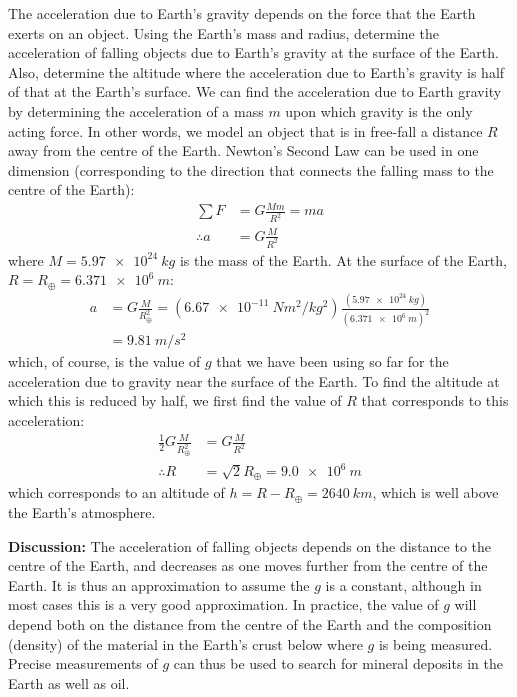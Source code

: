 \begin{example}{\label{ex:gravity:gofr}The acceleration due to Earth's gravity depends on the force that the Earth exerts on an object. Using the Earth's mass and radius, determine the acceleration of falling objects due to Earth's gravity at the surface of the Earth. Also, determine the altitude where the acceleration due to Earth's gravity is half of that at the Earth's surface.}
We can find the acceleration due to Earth gravity by determining the acceleration of a mass $m$ upon which gravity is the only acting force. In other words, we model an object that is in free-fall a distance $R$ away from the centre of the Earth. Newton's Second Law can be used in one dimension (corresponding to the direction that connects the falling mass to the centre of the Earth):
\begin{align*}
\sum F &= G\frac{Mm}{R^2}=ma\\
\therefore a&=G\frac{M}{R^2}
\end{align*}
where $M=\SI{5.97e24}{kg}$ is the mass of the Earth. At the surface of the Earth, $R=R_\oplus=\SI{6.371e6}{m}$:
\begin{align*}
a&=G\frac{M}{R_\oplus^2}=(\SI{6.67e-11}{Nm^2/kg^2})\frac{(\SI{5.97e24}{kg})}{(\SI{6.371e6}{m})^2}\\
&=\SI{9.81}{m/s^2}
\end{align*}
which, of course, is the value of $g$ that we have been using so far for the acceleration due to gravity near the surface of the Earth. To find the altitude at which this is reduced by half, we first find the value of $R$ that corresponds to this acceleration:
\begin{align*}
\frac{1}{2}G\frac{M}{R_\oplus^2}&=G\frac{M}{R^2}\\
\therefore R &=\sqrt{2}R_\oplus = \SI{9.0e6}{m}
\end{align*}
which corresponds to an altitude of $h=R-R_\oplus=\SI{2640}{km}$, which is well above the Earth's atmosphere.

\textbf{Discussion:} The acceleration of falling objects depends on the distance to the centre of the Earth, and decreases as one moves further from the centre of the Earth. It is thus an approximation to assume the $g$ is a constant, although in most cases this is a very good approximation. In practice, the value of $g$ will depend both on the distance from the centre of the Earth and the composition (density) of the material in the Earth's crust below where $g$ is being measured. Precise measurements of $g$ can thus be used to search for mineral deposits in the Earth as well as oil.  
\end{example}

